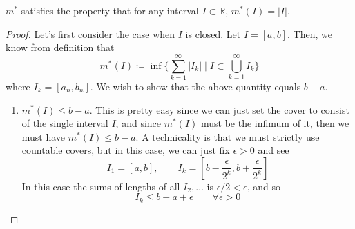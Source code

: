   \begin{theorem}
    \label{thm:lebesgue-outer-measure-coincides-with-interval}
    $m^\ast$ satisfies the property that for any interval $I \subset \mathbb{R}$, $m^\ast (I) = |I|$. 
  \end{theorem}
  \begin{proof}
    Let's first consider the case when $I$ is closed. Let $I = [a, b]$. Then, we know from definition that 
    \begin{equation}
      m^\ast (I) \coloneqq \inf \bigg\{ \sum_{k=1}^\infty |I_k| \;\bigg|\; I \subset \bigcup_{k=1}^\infty I_k\bigg\}
    \end{equation}
    where $I_k = [a_n, b_n]$. We wish to show that the above quantity equals $b - a$. 
    \begin{enumerate}
      \item $m^\ast (I) \leq b - a$. This is pretty easy since we can just set the cover to consist of the single interval $I$, and since $m^\ast (I)$ must be the infimum of it, then we must have $m^\ast(I) \leq b - a$. A technicality is that we must strictly use countable covers, but in this case, we can just fix $\epsilon > 0$ and see 
      \begin{equation}
        I_1 = [a, b], \qquad I_k = [b - \frac{\epsilon}{2^k}, b + \frac{\epsilon}{2^k}]
      \end{equation}
      In this case the sums of lengths of all $I_2, \ldots$ is $\epsilon/2 < \epsilon$, and so 
      \begin{equation}
        I_k \leq b - a + \epsilon \qquad \forall \epsilon > 0 
      \end{equation}


\end{enumerate}
\end{proof}
